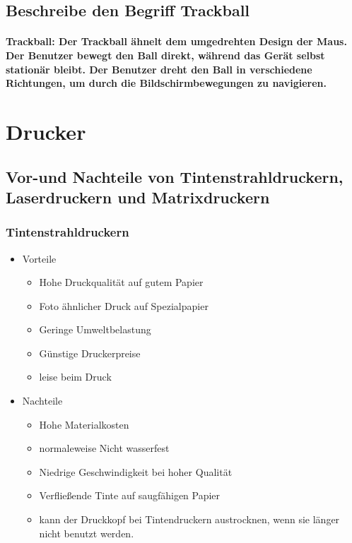 \documentclass[a4paper]{article}
\begin{document}
    \subsection{\color{red} Beschreibe den Begriff Trackball}\label{subsec:beschreibe-den-begriff-trackball}
    \paragraph{\color{codegreen} Trackball: Der Trackball ähnelt dem umgedrehten Design der Maus. Der Benutzer bewegt den Ball direkt, während das Gerät selbst stationär bleibt. Der Benutzer dreht den Ball in verschiedene Richtungen, um durch die Bildschirmbewegungen zu navigieren.}
    
    \section{Drucker}\label{sec:drucker}
    \subsection{\color{red} Vor-und Nachteile von Tintenstrahldruckern, Laserdruckern und Matrixdruckern}\label{subsec:vor-und-nachteile-von-tintenstrahldruckern-laserdruckern-und-matrixdruckern}
    \subsubsection{\color{codegreen}Tintenstrahldruckern}
    \begin{itemize}
        \color{red}
        \item Vorteile
        \begin{itemize}
            \color{blue}
            \item Hohe Druckqualität auf gutem Papier
            \item Foto ähnlicher Druck auf Spezialpapier
            \item Geringe Umweltbelastung
            \item Günstige Druckerpreise
            \item leise beim Druck
        \end{itemize}
        \item Nachteile
        \begin{itemize}
            \color{blue}
            \item Hohe Materialkosten
            \item normaleweise Nicht wasserfest
            \item Niedrige Geschwindigkeit bei hoher Qualität
            \item Verfließende Tinte auf saugfähigen Papier
            \item kann der Druckkopf bei Tintendruckern austrocknen, wenn sie länger nicht benutzt werden.
        \end{itemize}
    \end{itemize}
\end{document}
